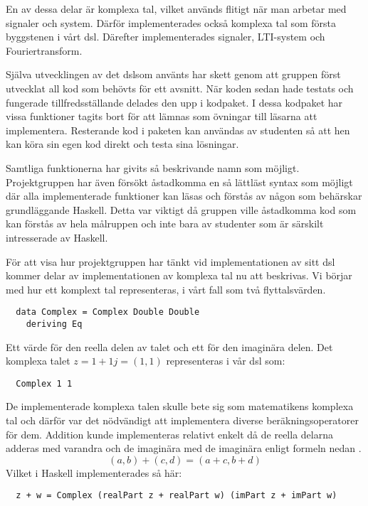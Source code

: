 \documentclass[12pt,a4paper,twoside,openright]{article}
\begin{document}
En av dessa delar är komplexa tal, vilket används flitigt när man
arbetar med signaler och system. Därför implementerades också komplexa
tal som första byggstenen i vårt \gls{dsl}. Därefter implementerades
signaler, LTI-system och Fouriertransform.

Själva utvecklingen av det \gls{dsl}som använts har skett genom att gruppen
först utvecklat all kod som behövts för ett avsnitt. När koden sedan
hade testats och fungerade tillfredsställande delades den upp i
kodpaket. I dessa kodpaket har vissa funktioner tagits bort för att
lämnas som övningar till läsarna att implementera. Resterande kod i
paketen kan användas av studenten så att hen kan köra sin egen kod
direkt och testa sina lösningar.

Samtliga funktionerna har givits så beskrivande namn som
möjligt. Projektgruppen har även försökt åstadkomma en så lättläst
syntax som möjligt där alla implementerade funktioner kan läsas och
förstås av någon som behärskar grundläggande Haskell. Detta var
viktigt då gruppen ville åstadkomma kod som kan förstås av hela
målruppen och inte bara av studenter som är särskilt intresserade av
Haskell.

För att visa hur projektgruppen har tänkt vid implementationen av sitt
\gls{dsl} kommer delar av implementationen av komplexa tal nu att
beskrivas. Vi börjar med hur ett komplext tal representeras, i vårt
fall som två flyttalsvärden.
\begin{verbatim}
  data Complex = Complex Double Double
    deriving Eq
\end{verbatim}
Ett värde för den reella delen av talet och ett för den imaginära
delen. Det komplexa talet \(z = 1 + 1j = (1,1) \) representeras i vår
\gls{dsl} som:

\begin{verbatim}
  Complex 1 1
\end{verbatim}

De implementerade komplexa talen skulle bete sig som matematikens
komplexa tal och därför var det nödvändigt att implementera diverse
beräkningsoperatorer för dem. Addition kunde implementeras relativt
enkelt då de reella delarna adderas med varandra och de imaginära med
de imaginära enligt formeln nedan \cite{conway1978functions}.
\[(a, b) + (c, d) = (a + c, b + d)\]
Vilket i Haskell implementerades så här:
\begin{verbatim}
  z + w = Complex (realPart z + realPart w) (imPart z + imPart w)
\end{verbatim}
\end{document}

